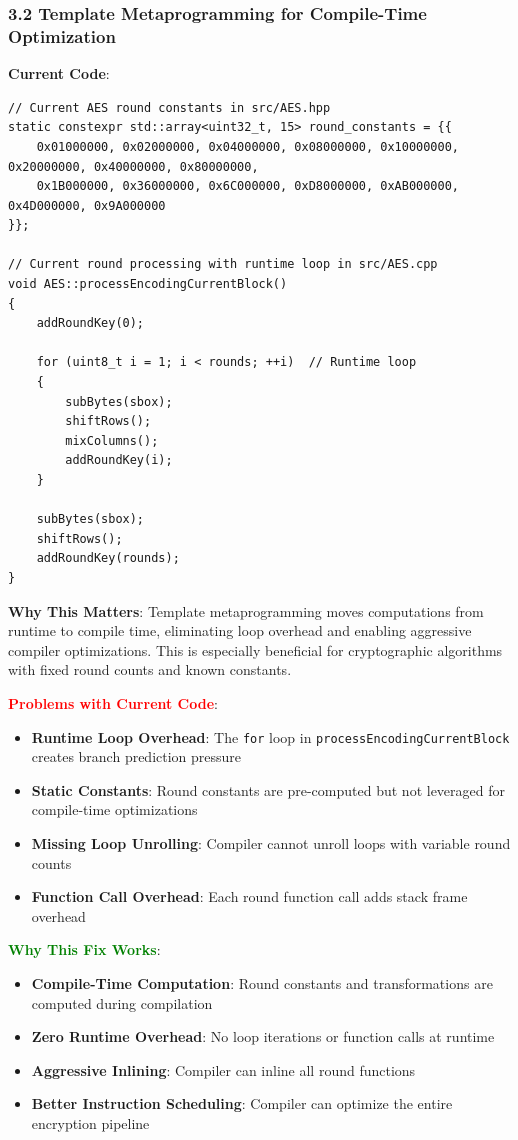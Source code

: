 \documentclass[11pt,a4paper]{article}
\begin{document}
\subsubsection{3.2 Template Metaprogramming for Compile-Time Optimization}

\textbf{Current Code}:
\begin{lstlisting}
// Current AES round constants in src/AES.hpp
static constexpr std::array<uint32_t, 15> round_constants = {{
    0x01000000, 0x02000000, 0x04000000, 0x08000000, 0x10000000, 0x20000000, 0x40000000, 0x80000000,
    0x1B000000, 0x36000000, 0x6C000000, 0xD8000000, 0xAB000000, 0x4D000000, 0x9A000000
}};

// Current round processing with runtime loop in src/AES.cpp
void AES::processEncodingCurrentBlock()
{
    addRoundKey(0);

    for (uint8_t i = 1; i < rounds; ++i)  // Runtime loop
    {
        subBytes(sbox);
        shiftRows();
        mixColumns();
        addRoundKey(i);
    }

    subBytes(sbox);
    shiftRows();
    addRoundKey(rounds);
}
\end{lstlisting}

\textbf{Why This Matters}: Template metaprogramming moves computations from runtime to compile time, eliminating loop overhead and enabling aggressive compiler optimizations. This is especially beneficial for cryptographic algorithms with fixed round counts and known constants.

\textcolor{red}{\textbf{Problems with Current Code}}:
\begin{itemize}
    \item \textbf{Runtime Loop Overhead}: The \texttt{for} loop in \texttt{processEncodingCurrentBlock} creates branch prediction pressure
    \item \textbf{Static Constants}: Round constants are pre-computed but not leveraged for compile-time optimizations
    \item \textbf{Missing Loop Unrolling}: Compiler cannot unroll loops with variable round counts
    \item \textbf{Function Call Overhead}: Each round function call adds stack frame overhead
\end{itemize}

\textcolor{green}{\textbf{Why This Fix Works}}:
\begin{itemize}
    \item \textbf{Compile-Time Computation}: Round constants and transformations are computed during compilation
    \item \textbf{Zero Runtime Overhead}: No loop iterations or function calls at runtime
    \item \textbf{Aggressive Inlining}: Compiler can inline all round functions
    \item \textbf{Better Instruction Scheduling}: Compiler can optimize the entire encryption pipeline
\end{itemize}
\end{document}

